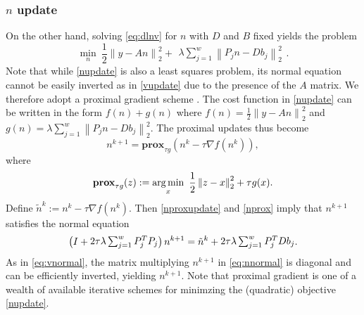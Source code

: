 \subsubsection{$n$ update}
On the other hand, solving \eqref{eq:dlnv} for $n$ with $D$ and $B$ fixed yields the problem
\begin{equation}\label{nupdate}
\min_{n} ~ \frac{1}{2} \left \| y - A n \right \|_2^2 + \begin{matrix} \lambda \sum_{j=1}^w  \left \| P_j n - D b_j \right \|_2^2 \end{matrix}.
\end{equation}
Note that while \eqref{nupdate} is also a least squares problem, its normal equation cannot be easily inverted as in \eqref{vupdate} due to the presence of the $A$ matrix. We therefore adopt a proximal gradient scheme \cite{parboyd}. The cost function in \eqref{nupdate} can be written in the form $f(n)+g(n)$ where $f(n) = \frac{1}{2} \left \| y - A n \right \|_2^2$ and $g(n) = \lambda \sum_{j=1}^w \left \| P_j n - D b_j \right \|_2^2$. The proximal updates thus become
\begin{equation} \label{nproxupdate}
n^{k+1} = \textbf{prox}_{\tau g}(n^{k} - \tau \nabla f(n^{k})),
\end{equation}
where
\begin{equation} \label{nprox}
\textbf{prox}_{\tau g} (z) := \operatorname*{arg\,min}_{x} \ \frac{1}{2} \left \| z - x \right \|_2^2 + \tau g(x).
\end{equation}
Define $\tilde{n}^{k} := n^{k} - \tau \nabla f(n^{k})$. Then \eqref{nproxupdate} and \eqref{nprox} imply that $n^{k+1}$ satisfies the normal equation
\begin{equation}\label{eq:nnormal}
 \left(I +  \begin{matrix} 2 \tau \lambda \sum_{j=1}^w P_j^T P_j \end{matrix} \right ) n^{k+1} = \tilde{n}^{k} + \begin{matrix} 2 \tau \lambda \sum_{j=1}^w P_j^T D b_j  \end{matrix}.
\vspace{1mm}
\end{equation}
As in \eqref{eq:vnormal}, the matrix multiplying $n^{k+1}$ in \eqref{eq:nnormal} is diagonal and can be efficiently inverted, yielding $n^{k+1}$. Note that proximal gradient is one of a wealth of available iterative schemes for minimzing  the (quadratic) objective \eqref{nupdate}.
